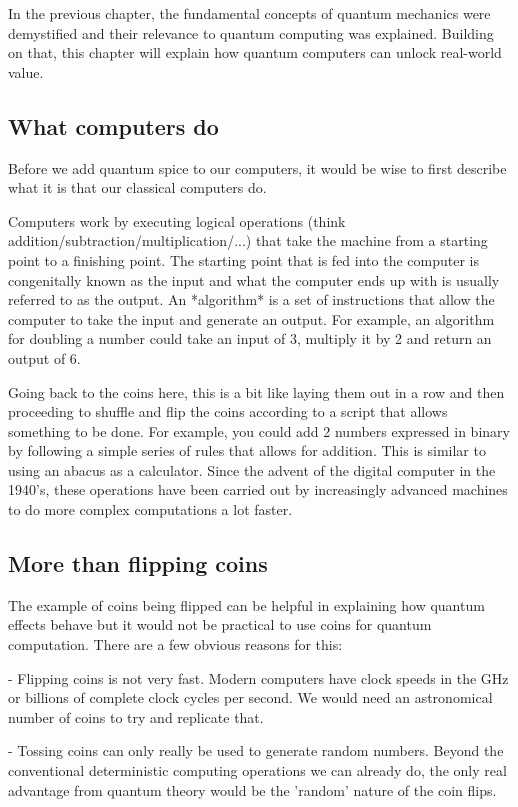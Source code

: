 \documentclass{book}
\begin{document}
In the previous chapter, the fundamental concepts of quantum mechanics were demystified and their relevance to quantum computing was explained. Building on that, this chapter will explain how quantum computers can unlock real-world value.

\subsection{What computers do}

Before we add quantum spice to our computers, it would be wise to first describe what it is that our classical computers do. 

Computers work by executing logical operations (think addition/subtraction/multiplication/...) that take the machine from a starting point to a finishing point. The starting point that is fed into the computer is congenitally known as the input and what the computer ends up with is usually referred to as the output. An *algorithm* is a set of instructions that allow the computer to take the input and generate an output. For example, an algorithm for doubling a number could take an input of 3, multiply it by 2 and return an output of 6. 

Going back to the coins here, this is a bit like laying them out in a row and then proceeding to shuffle and flip the coins according to a script that allows something to be done. For example, you could add 2 numbers expressed in binary by following a simple series of rules that allows for addition. This is similar to using an abacus as a calculator. Since the advent of the digital computer in the 1940's, these operations have been carried out by increasingly advanced machines to do more complex computations a lot faster.

\subsection{More than flipping coins} 

The example of coins being flipped can be helpful in explaining how quantum effects behave but it would not be practical to use coins for quantum computation. There are a few obvious reasons for this: 

- Flipping coins is not very fast. Modern computers have clock speeds in the GHz or billions of complete clock cycles per second. We would need an astronomical number of coins to try and replicate that. 

- Tossing coins can only really be used to generate random numbers. Beyond the conventional deterministic computing operations we can already do, the only real advantage from quantum theory would be the 'random' nature of the coin flips. 
\end{document}
